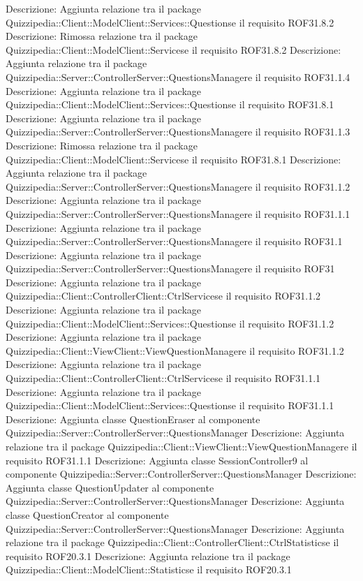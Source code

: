 Descrizione: Aggiunta relazione tra il package Quizzipedia::Client::ModelClient::Services::Questionse il requisito ROF31.8.2 
Descrizione: Rimossa relazione tra il package Quizzipedia::Client::ModelClient::Servicese il requisito ROF31.8.2 
Descrizione: Aggiunta relazione tra il package Quizzipedia::Server::ControllerServer::QuestionsManagere il requisito ROF31.1.4 
Descrizione: Aggiunta relazione tra il package Quizzipedia::Client::ModelClient::Services::Questionse il requisito ROF31.8.1 
Descrizione: Aggiunta relazione tra il package Quizzipedia::Server::ControllerServer::QuestionsManagere il requisito ROF31.1.3 
Descrizione: Rimossa relazione tra il package Quizzipedia::Client::ModelClient::Servicese il requisito ROF31.8.1 
Descrizione: Aggiunta relazione tra il package Quizzipedia::Server::ControllerServer::QuestionsManagere il requisito ROF31.1.2 
Descrizione: Aggiunta relazione tra il package Quizzipedia::Server::ControllerServer::QuestionsManagere il requisito ROF31.1.1 
Descrizione: Aggiunta relazione tra il package Quizzipedia::Server::ControllerServer::QuestionsManagere il requisito ROF31.1 
Descrizione: Aggiunta relazione tra il package Quizzipedia::Server::ControllerServer::QuestionsManagere il requisito ROF31 
Descrizione: Aggiunta relazione tra il package Quizzipedia::Client::ControllerClient::CtrlServicese il requisito ROF31.1.2 
Descrizione: Aggiunta relazione tra il package Quizzipedia::Client::ModelClient::Services::Questionse il requisito ROF31.1.2 
Descrizione: Aggiunta relazione tra il package Quizzipedia::Client::ViewClient::ViewQuestionManagere il requisito ROF31.1.2 
Descrizione: Aggiunta relazione tra il package Quizzipedia::Client::ControllerClient::CtrlServicese il requisito ROF31.1.1 
Descrizione: Aggiunta relazione tra il package Quizzipedia::Client::ModelClient::Services::Questionse il requisito ROF31.1.1 
Descrizione: Aggiunta classe QuestionEraser al componente Quizzipedia::Server::ControllerServer::QuestionsManager 
Descrizione: Aggiunta relazione tra il package Quizzipedia::Client::ViewClient::ViewQuestionManagere il requisito ROF31.1.1 
Descrizione: Aggiunta classe SessionController9 al componente Quizzipedia::Server::ControllerServer::QuestionsManager 
Descrizione: Aggiunta classe QuestionUpdater al componente Quizzipedia::Server::ControllerServer::QuestionsManager 
Descrizione: Aggiunta classe QuestionCreator al componente Quizzipedia::Server::ControllerServer::QuestionsManager 
Descrizione: Aggiunta relazione tra il package Quizzipedia::Client::ControllerClient::CtrlStatisticse il requisito ROF20.3.1 
Descrizione: Aggiunta relazione tra il package Quizzipedia::Client::ModelClient::Statisticse il requisito ROF20.3.1 
